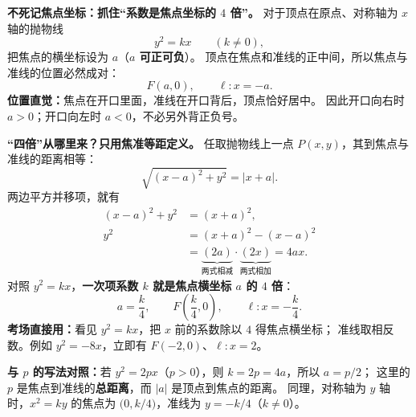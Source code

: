 \begin{statementbox}
\textbf{不死记焦点坐标：抓住“系数是焦点坐标的 $4$ 倍”。}
对于顶点在原点、对称轴为 $x$ 轴的抛物线
\[
\boxed{y^2=kx\qquad(k\ne 0)},
\]
把焦点的横坐标设为 $a$（\textbf{$a$ 可正可负}）。
顶点在焦点和准线的正中间，所以焦点与准线的位置必然成对：
\[
F(a,0),\qquad \ell:x=-a.
\]
\textbf{位置直觉：}焦点在开口里面，准线在开口背后，顶点恰好居中。
因此开口向右时 $a>0$；开口向左时 $a<0$，不必另外背正负号。

\medskip
\textbf{“四倍”从哪里来？只用焦准等距定义。}
任取抛物线上一点 $P(x,y)$，其到焦点与准线的距离相等：
\[
\sqrt{(x-a)^2+y^2}=|x+a|.
\]
两边平方并移项，就有
\[
\begin{aligned}
(x-a)^2+y^2&=(x+a)^2,\\
y^2&=(x+a)^2-(x-a)^2\\
&=\underbrace{(2a)}_{\text{两式相减}}
  \cdot\underbrace{(2x)}_{\text{两式相加}}
=\boxed{4ax}.
\end{aligned}
\]
对照 $y^2=kx$，\textbf{一次项系数 $k$ 就是焦点横坐标 $a$ 的 $4$ 倍}：
\[
\boxed{a=\frac{k}{4}},\qquad
\boxed{F\!\left(\frac{k}{4},0\right)},\qquad
\boxed{\ell:x=-\frac{k}{4}}.
\]
\textbf{考场直接用：}看见 $y^2=kx$，把 $x$ 前的系数除以 $4$ 得焦点横坐标；
准线取相反数。例如 $y^2=-8x$，立即有
$F(-2,0)$、$\ell:x=2$。

\medskip
\textbf{与 $p$ 的写法对照：}若 $y^2=2px$（$p>0$），则
$k=2p=4a$，所以 $a=p/2$；
这里的 $p$ 是焦点到准线的\textbf{总距离}，而 $|a|$ 是顶点到焦点的距离。
同理，对称轴为 $y$ 轴时，$x^2=ky$ 的焦点为
$\bigl(0,k/4\bigr)$，准线为 $y=-k/4$（$k\ne0$）。
\end{statementbox}
